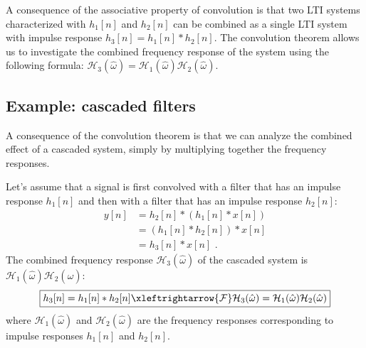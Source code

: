 \begin{marginfigure}

\begin{center}
\end{center}
\caption{A consequence of the associative property of convolution is
  that two LTI systems characterized with $h_1[n]$ and $h_2[n]$ can be
  combined as a single LTI system with impulse response
  $h_3[n]=h_1[n]*h_2[n]$. The convolution theorem allows us to
  investigate the combined frequency response of the system using the following formula:
  $\mathcal{H}_3(\hat{\omega})=\mathcal{H}_1(\hat{\omega})\mathcal{H}_2(\hat{\omega})$.}
\label{fig:cascade_lti}
\end{marginfigure}


\subsection{Example: cascaded filters}

A consequence of the convolution theorem is that we can analyze the
combined effect of a cascaded system, simply by multiplying together
the frequency responses.

Let's assume that a signal is first convolved with a filter that has
an impulse response $h_1[n]$ and then with a filter that has an
impulse response $h_2[n]$:
\begin{align}
  y[n] &= h_2[n]*(h_1[n]*x[n])\\
  &= (h_1[n]*h_2[n])*x[n]\\
  &= h_3[n]*x[n]\,\,.
\end{align}
The combined frequency response $\mathcal{H}_3(\hat{\omega})$ of the
cascaded system is $\mathcal{H}_1(\hat{\omega})\mathcal{H}_2(\hat{\omega})$:
\begin{equation}
  \boxed{
    h_3[n]=h_1[n]*h_2[n] \xleftrightarrow{\mathcal{F}} \mathcal{H}_3(\hat{\omega}) = \mathcal{H}_1(\hat{\omega})\mathcal{H}_2(\hat{\omega})
    }
\end{equation}
where $\mathcal{H}_1(\hat{\omega})$ and $\mathcal{H}_2(\hat{\omega})$
are the frequency responses corresponding to impulse responses
$h_1[n]$ and $h_2[n]$.

